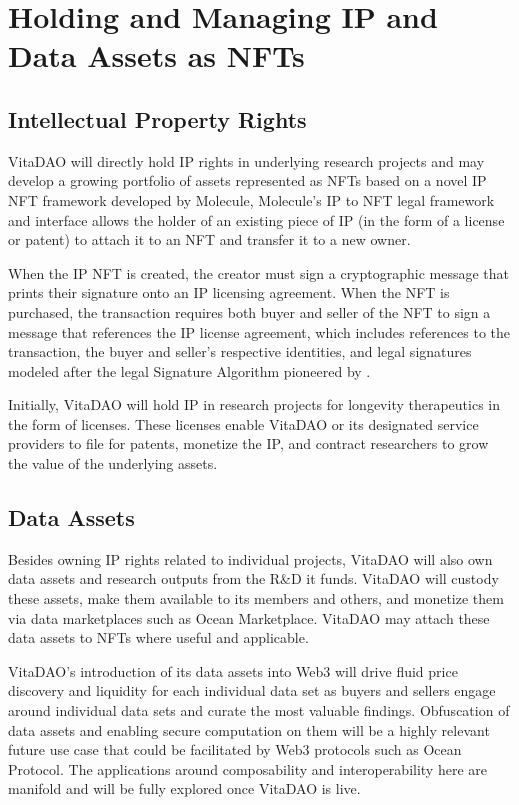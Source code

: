 \documentclass[12pt,letterpaper]{article}
\begin{document}
\section{Holding and Managing IP and Data Assets as NFTs}

\subsection{Intellectual Property Rights}
VitaDAO will directly hold IP rights in underlying research projects and may develop a growing portfolio of assets represented as NFTs based on a novel IP NFT framework developed by Molecule, Molecule’s IP to NFT legal framework and interface allows the holder of an existing piece of IP (in the form of a license or patent) to attach it to an NFT and transfer it to a new owner.

When the IP NFT is created, the creator must sign a cryptographic message that prints their signature onto an IP licensing agreement. When the NFT is purchased, the transaction requires both buyer and seller of the NFT to sign a message that references the IP license agreement, which includes references to the transaction, the buyer and seller’s respective identities, and legal signatures modeled after the legal Signature Algorithm pioneered by \citet{OpenLaw2019}.


Initially, VitaDAO will hold IP in research projects for longevity therapeutics in the form of licenses. These licenses enable VitaDAO or its designated service providers to file for patents, monetize the IP, and contract researchers to grow the value of the underlying assets.

\subsection{Data Assets}
Besides owning IP rights related to individual projects, VitaDAO will also own data assets and research outputs from the R\&D it funds. VitaDAO will custody these assets, make them available to its members and others, and monetize them via data marketplaces such as Ocean Marketplace. VitaDAO may attach these data assets to NFTs where useful and applicable. 

VitaDAO’s introduction of its data assets into Web3 will drive fluid price discovery and liquidity for each individual data set as buyers and sellers engage around individual data sets and curate the most valuable findings. Obfuscation of data assets and enabling secure computation on them will be a highly relevant future use case that could be facilitated by Web3 protocols such as Ocean Protocol. The applications around composability and interoperability here are manifold and will be fully explored once VitaDAO is live.
\end{document}
